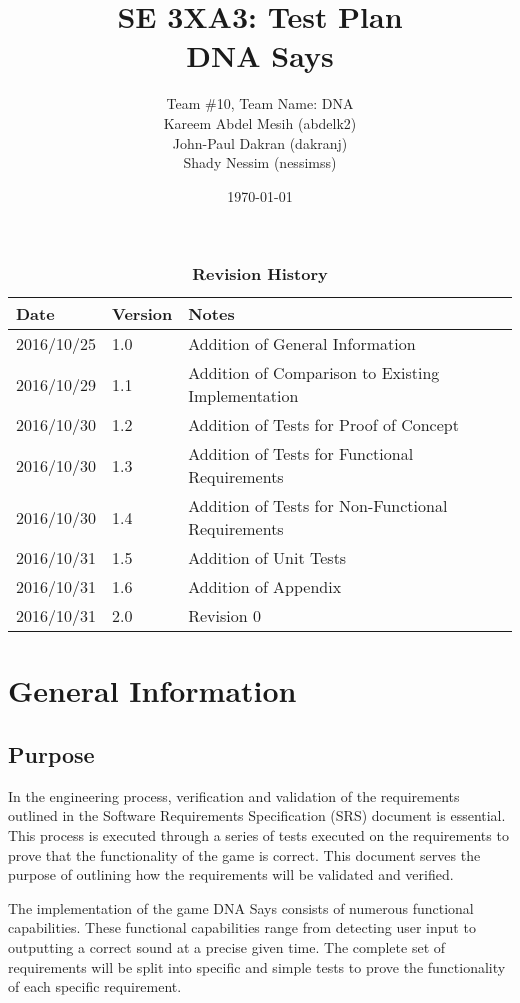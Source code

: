 \documentclass[12pt, titlepage]{article}
\title{SE 3XA3: Test Plan\\DNA Says}
\author{Team \#10, Team Name: DNA
		\\ Kareem Abdel Mesih (abdelk2)
		\\ John-Paul Dakran (dakranj)
		\\ Shady Nessim (nessimss)
}
\date{\today}
\begin{document}
\maketitle
{}
\tableofcontents
\listoftables

\begin{table}[h]
\caption{\bf Revision History}
\begin{tabularx}{\textwidth}{p{3cm}p{2cm}X}
\toprule {\bf Date} & {\bf Version} & {\bf Notes}\\
\midrule
2016/10/25 & 1.0 & Addition of General Information \\
2016/10/29 & 1.1 & Addition of Comparison to Existing Implementation\\
2016/10/30 & 1.2 & Addition of Tests for Proof of Concept\\
2016/10/30 & 1.3 & Addition of Tests for Functional Requirements\\
2016/10/30 & 1.4 & Addition of Tests for Non-Functional Requirements\\
2016/10/31 & 1.5 & Addition of Unit Tests\\
2016/10/31 & 1.6 & Addition of Appendix\\
2016/10/31 & 2.0 & Revision 0\\
\bottomrule
\end{tabularx}
\end{table}
\newpage
{}
\section{General Information}
\subsection{Purpose}

\par In the engineering process, verification and validation of the requirements outlined in the Software Requirements Specification (SRS) document is essential. This process is executed through a series of tests executed on the requirements to prove that the functionality of the game is correct. This document serves the purpose of outlining how the requirements will be validated and verified.
\\
\par The implementation of the game DNA Says consists of numerous functional capabilities. These functional capabilities range from detecting user input to outputting a correct sound at a precise given time. The complete set of requirements will be split into specific and simple tests to prove the functionality of each specific requirement. 
\end{document}
